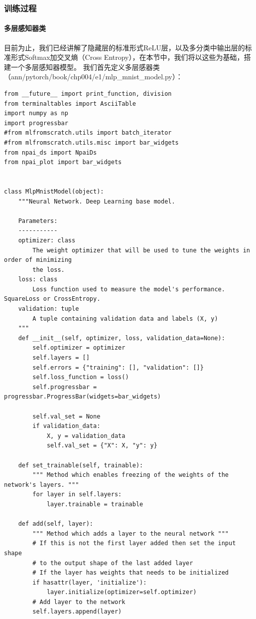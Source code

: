 \documentclass[UTF8]{article}
\begin{document}
\subsubsection{训练过程}
\paragraph{多层感知器类}
目前为止，我们已经讲解了隐藏层的标准形式ReLU层，以及多分类中输出层的标准形式Softmax加交叉熵（Cross Entropy），在本节中，我们将以这些为基础，搭建一个多层感知器模型。\newline
我们首先定义多层感器类（ann/pytorch/book/chp004/e1/mlp\_mnist\_model.py）：
\begin{lstlisting}
from __future__ import print_function, division
from terminaltables import AsciiTable
import numpy as np
import progressbar
#from mlfromscratch.utils import batch_iterator
#from mlfromscratch.utils.misc import bar_widgets
from npai_ds import NpaiDs
from npai_plot import bar_widgets


class MlpMnistModel(object):
    """Neural Network. Deep Learning base model.

    Parameters:
    -----------
    optimizer: class
        The weight optimizer that will be used to tune the weights in order of minimizing
        the loss.
    loss: class
        Loss function used to measure the model's performance. SquareLoss or CrossEntropy.
    validation: tuple
        A tuple containing validation data and labels (X, y)
    """
    def __init__(self, optimizer, loss, validation_data=None):
        self.optimizer = optimizer
        self.layers = []
        self.errors = {"training": [], "validation": []}
        self.loss_function = loss()
        self.progressbar = progressbar.ProgressBar(widgets=bar_widgets)

        self.val_set = None
        if validation_data:
            X, y = validation_data
            self.val_set = {"X": X, "y": y}

    def set_trainable(self, trainable):
        """ Method which enables freezing of the weights of the network's layers. """
        for layer in self.layers:
            layer.trainable = trainable

    def add(self, layer):
        """ Method which adds a layer to the neural network """
        # If this is not the first layer added then set the input shape
        # to the output shape of the last added layer
        # If the layer has weights that needs to be initialized 
        if hasattr(layer, 'initialize'):
            layer.initialize(optimizer=self.optimizer)
        # Add layer to the network
        self.layers.append(layer)


\end{lstlisting}
\end{document}
